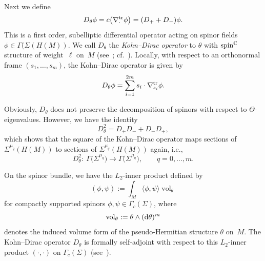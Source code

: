 \documentclass[pdftex]{sigma}
\numberwithin{equation}{section}
\newcommand{\CC}{\mathbb{C}}
\begin{document}
Next we define
\[
D_\theta\phi = c\big(\nabla_{\cdot}^{\rm tr}\phi\big) = (D_++D_-)\phi.
\]
This  is a first order, subelliptic differential operator acting on spinor fields $\phi\in\Gamma(\Sigma(H(M))$.
We call $D_\theta$ the {\em Kohn--Dirac operator} to $\theta$ with ${\rm spin}^\CC$ structure of weight~$\ell$ on~$M$ (see~\cite{Pet}; cf.~\cite{LeiN1, Stadt}).
Locally, with respect to an orthonormal frame $(s_1,\dots,s_m)$, the Kohn--Dirac operator is given by
\[
D_\theta\phi = \sum_{i=1}^{2m} s_i\cdot \nabla^{\rm tr}_{s_i}\phi.
\]

Obviously, $D_\theta$ does not preserve the decomposition of spinors with respect to $\Theta$-eigenvalues.
However, we have the identity
\[
D^2_\theta = D_+D_- + D_-D_+,
\]
which shows that the square of the Kohn--Dirac operator maps sections
of $\Sigma^{\mu_q}(H(M))$ to sections of $\Sigma^{\mu_q}(H(M))$ again, i.e.,
\[D_\theta^2\colon \ \Gamma\big(\Sigma^{\mu_q}\big)\to \Gamma\big(\Sigma^{\mu_q}\big),\qquad q=0,\dots,m.\]

On the spinor bundle, we have the $L_2$-inner product defined by
\[
(\phi,\psi) := \int_{M} \langle\phi,\psi\rangle \operatorname{vol}_\theta
\]
for compactly supported spinors $\phi,\psi\in\Gamma_c(\Sigma)$, where
\[
\operatorname{vol}_\theta := \theta\wedge ({\rm d}\theta)^m
\]
denotes the induced volume form of the pseudo-Hermitian structure $\theta$ on~$M$.
The Kohn--Dirac operator $D_\theta$ is formally self-adjoint with respect to this $L_2$-inner product $(\cdot,\cdot)$ on $\Gamma_c(\Sigma)$ (see~\cite{LeiN1}).
\end{document}
